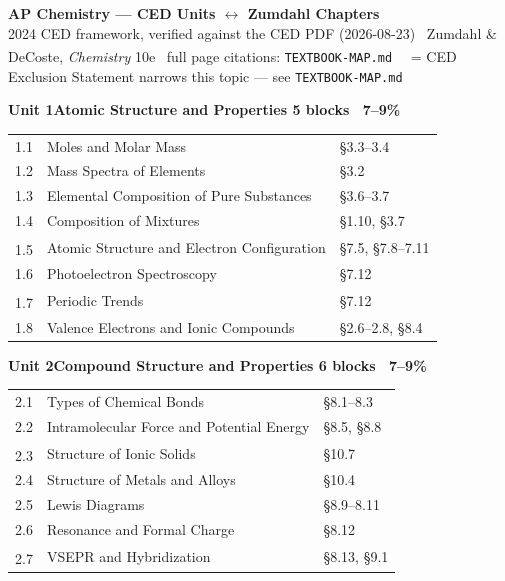 \documentclass[10pt]{article}
\makeatletter
\newcommand{\uband}[3]{%
  \par\vspace{1pt}\noindent
  \colorbox{apclight}{\begin{minipage}{\dimexpr\linewidth-2\fboxsep\relax}
    \sffamily\bfseries\footnotesize\color{apcaccent}Unit #1\quad#2%
    \hfill\normalfont\footnotesize\color{apcgray}#3
  \end{minipage}}\par\vspace{1pt}%
}
\newcommand{\dg}{\textsuperscript{\dag}}
\newenvironment{utab}{\begin{tabular}{@{}C@{\hspace{2pt}}T@{\hspace{2pt}}Z@{}}}{\end{tabular}\par}
\makeatother
\begin{document}
\thispagestyle{empty}

\begin{center}
{\sffamily\bfseries\Large\color{apcaccent}AP Chemistry --- CED Units $\leftrightarrow$ Zumdahl Chapters}\\[1pt]
{\sffamily\footnotesize\color{apcgray}%
2024 CED framework, verified against the CED PDF (2026-08-23) \textbullet\
Zumdahl \& DeCoste, \textit{Chemistry} 10e \textbullet\
full page citations: \texttt{TEXTBOOK-MAP.md} \textbullet\
\dg\ = CED Exclusion Statement narrows this topic --- see \texttt{TEXTBOOK-MAP.md}}
\end{center}
\vspace{2pt}

\noindent
\begin{minipage}[t]{3.28in}

\uband{1}{Atomic Structure and Properties}{5 blocks \textbullet\ 7--9\%}
\begin{utab}
1.1 & Moles and Molar Mass & \S3.3--3.4\\
1.2 & Mass Spectra of Elements & \S3.2\\
1.3 & Elemental Composition of Pure Substances & \S3.6--3.7\\
1.4 & Composition of Mixtures & \S1.10, \S3.7\\
1.5\dg & Atomic Structure and Electron Configuration & \S7.5, \S7.8--7.11\\
1.6 & Photoelectron Spectroscopy & \S7.12\\
1.7\dg & Periodic Trends & \S7.12\\
1.8 & Valence Electrons and Ionic Compounds & \S2.6--2.8, \S8.4\\
\end{utab}

\uband{2}{Compound Structure and Properties}{6 blocks \textbullet\ 7--9\%}
\begin{utab}
2.1 & Types of Chemical Bonds & \S8.1--8.3\\
2.2 & Intramolecular Force and Potential Energy & \S8.5, \S8.8\\
2.3\dg & Structure of Ionic Solids & \S10.7\\
2.4 & Structure of Metals and Alloys & \S10.4\\
2.5 & Lewis Diagrams & \S8.9--8.11\\
2.6 & Resonance and Formal Charge & \S8.12\\
2.7\dg & VSEPR and Hybridization & \S8.13, \S9.1\\
\end{utab}


\end{minipage}
\end{document}
